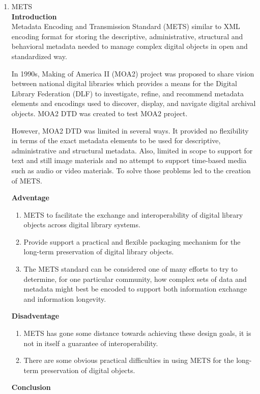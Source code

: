 \begin{enumerate}
	\item METS\\
	{\bf Introduction}\\
	Metadata Encoding and Transmission Standard (METS) similar to XML encoding format for storing the descriptive, administrative, structural and behavioral metadata needed to manage complex digital objects in open and standardized way.
	
	In 1990s, Making of America II (MOA2) project was proposed to share vision between national digital libraries which provides a means for the Digital Library Federation (DLF) to investigate, refine, and recommend metadata elements and encodings used to discover, display, and navigate digital archival objects. MOA2 DTD was created to test MOA2 project.
	
	However, MOA2 DTD was limited in several ways. It provided no flexibility in terms of the exact metadata elements to be used for descriptive, administrative and structural metadata. Also, limited in scope to support for text and still image materials and no attempt to support time-based media such as audio or video materials. To solve those problems led to the creation of METS.
	
	{\bf Adventage}
	\begin{enumerate}
		\item METS to facilitate the exchange and interoperability of digital library objects across digital library systems.
		\item Provide support a practical and flexible packaging mechanism for the long-term preservation of digital library objects.
		\item The METS standard can be considered one of many efforts to try to determine, for one particular community, how complex sets of data and metadata might best be encoded to support both information exchange and information longevity.
	\end{enumerate}	
	{\bf Disadventage}
	\begin{enumerate}
		\item METS has gone some distance towards achieving these design goals, it is not in itself a guarantee of interoperability.
		\item There are some obvious practical difficulties in using METS for the long-term preservation of digital objects.
	\end{enumerate}
	{\bf Conclusion}\\	
	

\end{enumerate}
